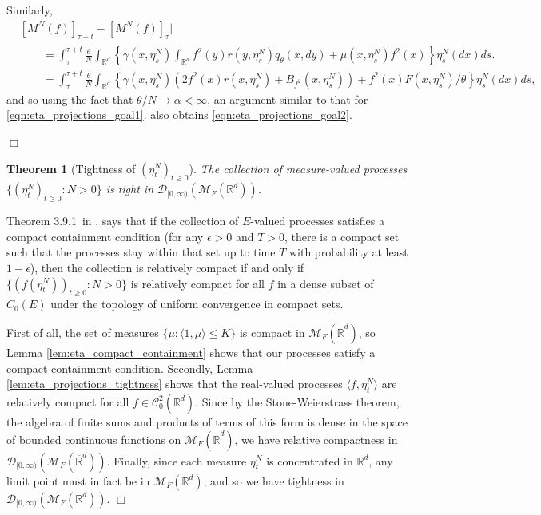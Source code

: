 \documentclass[12pt]{article}
\newenvironment {proof}{{\noindent\bf Proof }}{\hfill $\Box$ \medskip}
\newtheorem{theorem}{Theorem}[section]
\newcommand{\IR}{\mathbb R}
\newcommand{\measures}{\mathcal{M}_F(\IR^d)} %
\newcommand{\cmeasures}{\mathcal{M}_F(\overline{\IR}^d)} %
\begin{document}
\begin{proof}
Similarly,
\begin{align*}
    &
    [M^{N}(f)]_{\tau + t} 
        - [M^{N}(f)]_\tau \big|
    \\ & \qquad =
    \int_{\tau}^{\tau + t}
        \frac{\theta}{N}
        \int_{\IR^d}
        \left\{
            \gamma(x, \eta^N_s)
            \int_{\IR^d} f^2(y) r(y, \eta^N_s) q_\theta(x, dy)
            +
            \mu(x, \eta^N_s) f^2(x)
        \right\}
        \eta^N_s(dx)
    ds .
    \\ & \qquad =
    \int_{\tau}^{\tau + t}
        \frac{\theta}{N}
        \int_{\IR^d}
        \left\{
            \gamma(x, \eta^N_s)
            \left(
                2 f^2(x) r(x, \eta^N_s)
                +
                B_{f^2}(x, \eta^N_s)
            \right)
            +
            f^2(x) F(x, \eta^N_s) / \theta
        \right\}
        \eta^N_s(dx)
    ds ,
\end{align*}
and so using the fact that $\theta/N \to \alpha < \infty$,
an argument similar to 
that for \eqref{eqn:eta_projections_goal1}.
also obtains \eqref{eqn:eta_projections_goal2}.

\end{proof}

\begin{theorem}[Tightness of $(\eta^{N}_t)_{t \geq 0}$]
    The collection of measure-valued processes 
    $\{(\eta^{N}_t)_{t \geq 0}: N > 0\}$
    is tight in $\mathcal{D}_{[0,\infty)}(\measures)$.
\end{theorem}

\begin{proof}
    Theorem 3.9.1~in \cite{EK},
    says that if the collection of $E$-valued processes
    satisfies a compact containment condition
    (for any $\epsilon > 0$ and $T>0$, there is a compact set
    such that the processes stay within that set up to time $T$ with probability at least $1-\epsilon$),
    then the collection is relatively compact
    if and only if
    $\{(f(\eta^{N}_t))_{t \geq 0}: N > 0\}$ is relatively compact
    for all $f$ in a dense subset of $C_0(E)$
    under the topology of uniform convergence in compact sets.

    First of all,
    the set of measures $\{ \mu: \langle 1, \mu \rangle \leq K \} $ is compact in $\cmeasures$,
    so Lemma \ref{lem:eta_compact_containment}
    shows that our processes satisfy a compact containment condition.
    Secondly, Lemma \ref{lem:eta_projections_tightness}
    shows that the real-valued processes $\langle f, \eta^{N}_t \rangle$
    are relatively compact for all $f \in \mathcal{C}^{2}_{0}(\overline{\IR^d})$.
    Since by the Stone-Weierstrass theorem,
    the algebra of finite sums and products of terms of this form
    is dense in the space of bounded continuous functions on $\cmeasures$,
    we have relative compactness in $\mathcal{D}_{[0,\infty)}(\cmeasures)$.
    Finally,
    since each measure $\eta^{N}_t$ is concentrated in $\IR^d$,
    any limit point must in fact be in $\measures$,
    and so we have 
    tightness in $\mathcal{D}_{[0,\infty)}(\measures)$.
\end{proof}
\end{document}
